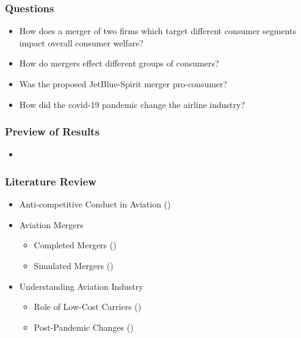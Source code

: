 \documentclass[xcolor=dvipsnames]{beamer}
\begin{document}
    \begin{frame}
    \frametitle{Questions}
        \begin{itemize}
        \item How does a merger of two firms which target different consumer segments impact overall consumer welfare?
        \item How do mergers effect different groups of consumers?
        \item Was the proposed JetBlue-Spirit merger pro-consumer?
        \item How did the covid-19 pandemic change the airline industry?
        \end{itemize}   
    \end{frame}

    \begin{frame}
        \frametitle{Preview of Results}
        \begin{itemize}
            \item 
        \end{itemize}
    \end{frame}

    \begin{frame}
		\frametitle{Literature Review}			\begin{itemize}
				\item Anti-competitive Conduct in Aviation (\cite{miller_did_2010, zou_assessing_2023})
				\item Aviation Mergers 
				\begin{itemize}
					\item Completed Mergers (\cite{luo_price_2014, carlton_are_2019})
					\item Simulated Mergers (\cite{ciliberto_market_2021, li_repositioning_2022})
				\end{itemize}
				\item Understanding Aviation Industry
				\begin{itemize}
					\item Role of Low-Cost Carriers (\cite{goolsbee_how_2008, shrago_spirit_2024})
					\item Post-Pandemic Changes (\cite{zou_assessing_2023, ewen_zoom_2023})
				\end{itemize}
        \end{itemize}
	\end{frame}
	
\end{document}
